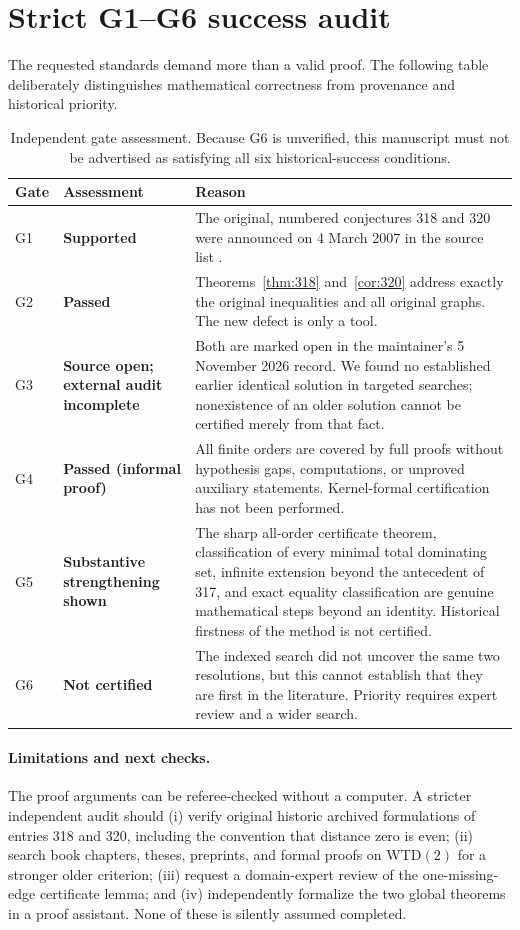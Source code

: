\documentclass[11pt,a4paper]{article}
\theoremstyle{definition}\newtheorem{definition}[theorem]{Definition}
\theoremstyle{remark}\newtheorem{remark}[theorem]{Remark}
\begin{document}
\section{Strict G1--G6 success audit}\label{sec:gates}
The requested standards demand more than a valid proof. The following table deliberately distinguishes mathematical correctness from provenance and historical priority.
\begin{table}[ht]
\small\centering
\renewcommand{\arraystretch}{1.3}
\begin{tabular}{@{}p{.095\linewidth}p{.145\linewidth}p{.69\linewidth}@{}}\toprule
Gate&Assessment&Reason\\\midrule
G1&\textbf{Supported}&The original, numbered conjectures 318 and 320 were announced on 4 March 2007 in the source list \cite{DeLaVina2026}.\\
G2&\textbf{Passed}&Theorems~\ref{thm:318} and~\ref{cor:320} address exactly the original inequalities and all original graphs. The new defect is only a tool.\\
G3&\textbf{Source open; external audit incomplete}&Both are marked open in the maintainer's 5 November 2026 record. We found no established earlier identical solution in targeted searches; nonexistence of an older solution cannot be certified merely from that fact.\\
G4&\textbf{Passed (informal proof)}&All finite orders are covered by full proofs without hypothesis gaps, computations, or unproved auxiliary statements. Kernel-formal certification has not been performed.\\
G5&\textbf{Substantive strengthening shown}&The sharp all-order certificate theorem, classification of every minimal total dominating set, infinite extension beyond the antecedent of 317, and exact equality classification are genuine mathematical steps beyond an identity. Historical firstness of the method is not certified.\\
G6&\textbf{Not certified}&The indexed search did not uncover the same two resolutions, but this cannot establish that they are first in the literature. Priority requires expert review and a wider search.\\\bottomrule
\end{tabular}
\caption{Independent gate assessment. Because G6 is unverified, this manuscript must not be advertised as satisfying all six historical-success conditions.}
\end{table}

\paragraph{Limitations and next checks.}
The proof arguments can be referee-checked without a computer. A stricter independent audit should (i) verify original historic archived formulations of entries 318 and 320, including the convention that distance zero is even; (ii) search book chapters, theses, preprints, and formal proofs on WTD$(2)$ for a stronger older criterion; (iii) request a domain-expert review of the one-missing-edge certificate lemma; and (iv) independently formalize the two global theorems in a proof assistant. None of these is silently assumed completed.
\end{document}
